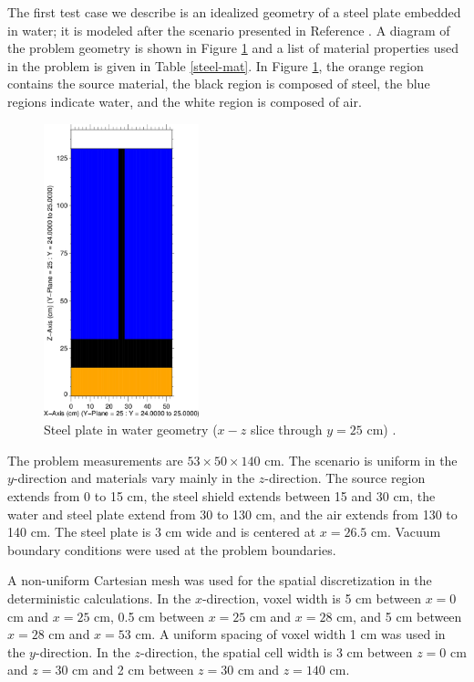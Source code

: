 \documentclass{article} %
\begin{document}
The first test case we describe is an idealized geometry of a steel plate 
embedded in water; it is modeled after the scenario presented in Reference 
\cite{wilsonslaybaugh}. 
A diagram of the problem geometry is shown in Figure \ref{steelxz} and a list
of material properties used in the problem is given in Table \ref{steel-mat}.
In Figure \ref{steelxz}, the orange region contains the source material, the 
black region is composed of steel, the blue regions indicate water, and the 
white region is composed of air.

\begin{figure}[!htb]
\centering
\includegraphics[width=0.4\textwidth]{img/steel-xz.png}
\caption{Steel plate in water geometry ($x-z$ slice through $y = 25$ cm) 
         \cite{wilsonslaybaugh}.}
\label{steelxz}
\end{figure}

The problem measurements are $53\times50\times140$ cm. The scenario is uniform 
in the $y$-direction and materials vary mainly in the $z$-direction. The source
region extends from 0 to 15 cm, the steel shield extends between 15 and 30 cm, 
the water and steel plate extend from 30 to 130 cm, and the air extends from 
130 to 140 cm. The steel plate is 3 cm wide and is centered at $x = 26.5$ cm. 
Vacuum boundary conditions were used at the problem boundaries.

A non-uniform Cartesian mesh was used for the spatial discretization in the 
deterministic calculations. In the $x$-direction, voxel width is 5 cm between
$x = 0$ cm and $x = 25$ cm, 0.5 cm between $x = 25$ cm and $x = 28$ cm, and 5 
cm between $x = 28$ cm and $x = 53$ cm. A uniform spacing of voxel width 1 cm 
was used in the $y$-direction. In the $z$-direction, the spatial cell width is
3 cm between $z = 0$ cm and $z = 30$ cm and 2 cm between $z = 30$ cm and 
$z = 140$ cm.
\end{document}
